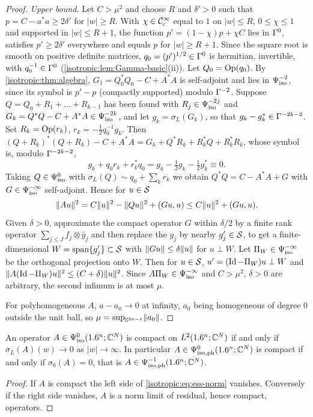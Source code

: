 \begin{proof}
\emph{Upper bound.} Let $C>\mu^2$ and choose $R$ and $\delta'>0$ such that
$p=C-a^*a\ge2\delta'$ for $|w|\ge R$. With $\chi\in\mathcal{C}^\infty_{\mathrm{c}}$ equal to $1$ on
$|w|\le R$, $0\le\chi\le1$ and supported in $|w|\le R+1$, the function
$p'=(1-\chi)p+\chi C$ lies in $\Gamma^{0}$, satisfies $p'\ge2\delta'$ everywhere and
equals $p$ for $|w|\ge R+1$. Since the square root is smooth on positive
definite matrices, $q_0=(p')^{1/2}\in\Gamma^{0}$ is hermitian, invertible, with
$q_0^{-1}\in\Gamma^{0}$ (\cref{isotropic:lem:Gamma-basic}(ii)). Let $Q_0=\operatorname{Op}(q_0)$.
By \cref{isotropic:thm:algebra}, $G_1=Q_0^*Q_0-C+A^*A$ is self-adjoint and lies
in $\Psi^{-2}_{\mathrm{iso}}$, since its symbol is $p'-p$ (compactly supported) modulo
$\Gamma^{-2}$. Suppose $Q=Q_0+R_1+\dots+R_{k-1}$ has been found with $R_j\in\Psi^{-2j}_{\mathrm{iso}}$
and $G_k=Q^*Q-C+A^*A\in\Psi^{-2k}_{\mathrm{iso}}$, and let $g_k=\sigma_L(G_k)$, so that
$g_k-g_k^*\in\Gamma^{-2k-2}$. Set $R_k=\operatorname{Op}(r_k)$, $r_k=-\tfrac12q_0^{-1}g_k$. Then
$(Q+R_k)^*(Q+R_k)-C+A^*A=G_k+Q^*R_k+R_k^*Q+R_k^*R_k$, whose symbol is, modulo
$\Gamma^{-2k-2}$,
\begin{equation*}
  g_k+q_0r_k+r_k^*q_0=g_k-\tfrac12g_k-\tfrac12g_k^*\equiv0 .
\end{equation*}
Taking $Q\in\Psi^{0}_{\mathrm{iso}}$ with $\sigma_L(Q)\sim q_0+\sum_k r_k$ we obtain
$Q^*Q=C-A^*A+G$ with $G\in\Psi^{-\infty}_{\mathrm{iso}}$ self-adjoint. Hence for $u\in\mathcal{S}$
\begin{equation*}
  \lVert Au\rVert^2=C\lVert u\rVert^2-\lVert Qu\rVert^2+(Gu,u)\le C\lVert u\rVert^2+(Gu,u).
\end{equation*}
Given $\delta>0$, approximate the compact operator $G$ within $\delta/2$ by a
finite rank operator $\sum_{j\le J}f_j\otimes\bar g_j$ and then replace the $g_j$
by nearby $g_j'\in\mathcal{S}$, to get a finite-dimensional $W=\operatorname{span}\{g_j'\}\subset\mathcal{S}$
with $\lVert Gu\rVert\le\delta\lVert u\rVert$ for $u\perp W$. Let $\Pi_W\in\Psi^{-\infty}_{\mathrm{iso}}$ be the
orthogonal projection onto $W$. Then for $u\in\mathcal{S}$, $u'=(\operatorname{Id}-\Pi_W)u\perp W$ and
$\lVert A(\operatorname{Id}-\Pi_W)u\rVert^2\le(C+\delta)\lVert u\rVert^2$. Since $A\Pi_W\in\Psi^{-\infty}_{\mathrm{iso}}$
and $C>\mu^2$, $\delta>0$ are arbitrary, the second infimum is at most $\mu$.

For polyhomogeneous $A$, $a-a_0\to0$ at infinity, $a_0$ being homogeneous of
degree $0$ outside the unit ball, so $\mu=\sup_{\mathbb{S}^{2n-1}}\lVert a_0\rVert$.
\end{proof}

\begin{corollary}\label{isotropic:cor:compact-iff}
An operator $A\in\Psi^{0}_{\mathrm{iso}}(1.6^n;\mathbb{C}^N)$ is compact on $L^2(1.6^n;\mathbb{C}^N)$ if and
only if $\sigma_L(A)(w)\to0$ as $|w|\to\infty$. In particular
$A\in\Psi^{0}_{\mathrm{iso,ph}}(1.6^n;\mathbb{C}^N)$ is compact if and only if $\sigma_0(A)=0$, that is
$A\in\Psi^{-1}_{\mathrm{iso,ph}}(1.6^n;\mathbb{C}^N)$.
\end{corollary}
\begin{proof}
If $A$ is compact the left side of \eqref{isotropic:eq:ess-norm} vanishes.
Conversely if the right side vanishes, $A$ is a norm limit of residual, hence
compact, operators.
\end{proof}

